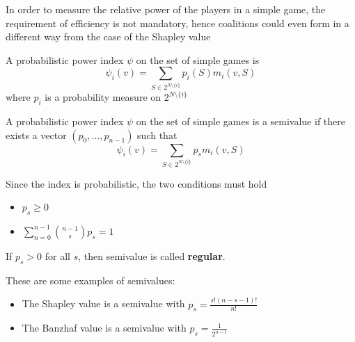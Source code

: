 \documentclass[../main.tex]{subfiles}
\begin{document}
In order to measure the relative power of the players in a simple game, the requirement of efficiency is not mandatory, hence coalitions could even form in a different way from the case of the Shapley value
\begin{definition}
    A probabilistic power index $\psi$ on the set of simple games is
    \[
        \psi_i(v) = \sum_{S \in 2^{N \setminus \{i\}}} p_i (S) m_i (v,S)
    \]
    where $p_i$ is a probability measure on $2^{N \setminus \{i\}}$
\end{definition}
\begin{definition}[Semivalue]
    A probabilistic power index $\psi$ on the set of simple games is a semivalue if there exists a vector $(p_0,\ldots,p_{n-1})$ such that
    \[
        \psi_i(v) = \sum_{S \in 2^{N \setminus \{i\}}} p_s m_i (v,S)
    \]
\end{definition}
\begin{remark}
    Since the index is probabilistic, the two conditions must hold
    \begin{itemize}
        \item $p_s \geq 0$
        \item $\sum_{n=0}^{n-1} \binom{n-1}{s} p_s = 1$
    \end{itemize}
    If $p_s > 0$ for all $s$, then semivalue is called \textbf{regular}.
\end{remark}
These are some examples of semivalues:
\begin{itemize}
    \item The Shapley value is a semivalue with $p_s = \frac{s!(n-s-1)!}{n!}$
    \item The Banzhaf value is a semivalue with $p_s = \frac{1}{2^{n-1}}$
\end{itemize}
\end{document}
